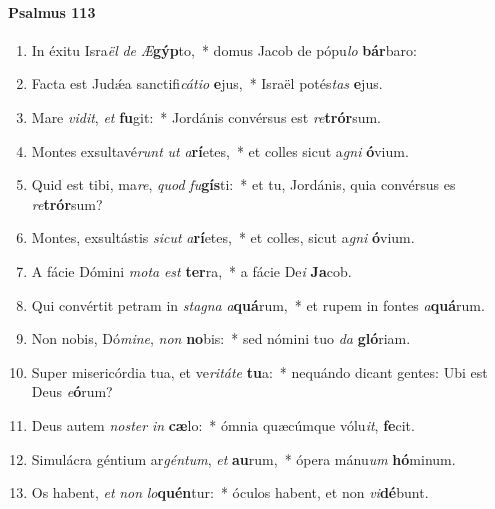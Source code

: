 \documentclass[twoside]{article}
\begin{document}
\begin{paracol}[1]{2}
\switchcolumn*
\paragraph{Psalmus 113}


\begin{enumerate}[wide, itemsep=0mm, labelwidth=!, labelindent=0pt, label=\color{gregoriocolor}\theenumi]
\item In éxitu Isra\textit{ël} \textit{de} \textit{Æ}\textbf{gýp}to,~* domus Jacob de pópu\textit{lo} \textbf{bár}baro:
\item Facta est Judǽa sanctifi\textit{cá}\textit{ti}\textit{o} \textbf{e}jus,~* Israël potés\textit{tas} \textbf{e}jus.
\item Mare \textit{vi}\textit{dit}, \textit{et} \textbf{fu}git:~* Jordánis convérsus est \textit{re}\textbf{trór}sum.
\item Montes exsultavé\textit{runt} \textit{ut} \textit{a}\textbf{rí}etes,~* et colles sicut a\textit{gni} \textbf{ó}vium.
\item Quid est tibi, ma\textit{re}, \textit{quod} \textit{fu}\textbf{gís}ti:~* et tu, Jordánis, quia convérsus es \textit{re}\textbf{trór}sum?
\item Montes, exsultástis \textit{sic}\textit{ut} \textit{a}\textbf{rí}etes,~* et colles, sicut a\textit{gni} \textbf{ó}vium.
\item A fácie Dómini \textit{mo}\textit{ta} \textit{est} \textbf{ter}ra,~* a fácie De\textit{i} \textbf{Ja}cob.
\item Qui convértit petram in \textit{sta}\textit{gna} \textit{a}\textbf{quá}rum,~* et rupem in fontes \textit{a}\textbf{quá}rum.
\item Non nobis, Dó\textit{mi}\textit{ne}, \textit{non} \textbf{no}bis:~* sed nómini tuo \textit{da} \textbf{gló}riam.
\item Super misericórdia tua, et ve\textit{ri}\textit{tá}\textit{te} \textbf{tu}a:~* nequándo dicant gentes: Ubi est Deus \textit{e}\textbf{ó}rum?
\item Deus autem \textit{nos}\textit{ter} \textit{in} \textbf{cæ}lo:~* ómnia quæcúmque vólu\textit{it}, \textbf{fe}cit.
\item Simulácra géntium ar\textit{gén}\textit{tum}, \textit{et} \textbf{au}rum,~* ópera mánu\textit{um} \textbf{hó}minum.
\item Os habent, \textit{et} \textit{non} \textit{lo}\textbf{quén}tur:~* óculos habent, et non \textit{vi}\textbf{dé}bunt.

\end{enumerate}
\end{paracol}
\end{document}
